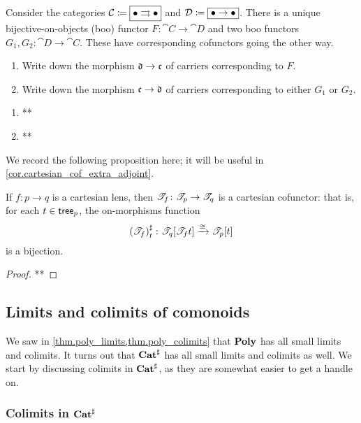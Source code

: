 \documentclass[Book-Poly]{subfiles}
\begin{document}
\begin{exercise}
Consider the categories $\mathcal{C}\coloneqq\fbox{$\bullet\rightrightarrows\bullet$}$ and $\mathcal{D}\coloneqq\fbox{$\bullet\to\bullet$}$. There is a unique bijective-on-objects (boo) functor $F\colon\cat{C}\to\cat{D}$ and two boo functors $G_1,G_2\colon\cat{D}\to\cat{C}$. These have corresponding cofunctors going the other way.
\begin{enumerate}
	\item Write down the morphism $\mathfrak{d}\to\mathfrak{c}$ of carriers corresponding to $F$.
	\item Write down the morphism $\mathfrak{c}\to\mathfrak{d}$ of carriers corresponding to either $G_1$ or $G_2$.
\qedhere
\end{enumerate}
\begin{solution}
\begin{enumerate}
    \item **
    \item **
\end{enumerate}
\end{solution}
\end{exercise}

We record the following proposition here; it will be useful in \cref{cor.cartesian_cof_extra_adjoint}.

\begin{proposition}
If $f\colon p\to q$ is a cartesian lens, then $\mathscr{T}_{f}\colon\mathscr{T}_{p}\to\mathscr{T}_{q}$ is a cartesian cofunctor: that is, for each $t\in\mathsf{tree}_p$, the on-morphisms function
\[
    \left(\mathscr{T}_{f}\right)^\sharp_t\colon\mathscr{T}_{q}[\mathscr{T}_{f}t]\xrightarrow{\cong}\mathscr{T}_{p}[t]
\]
is a bijection.
\end{proposition}
\begin{proof}
**
\end{proof}

\subsection{Limits and colimits of comonoids}

We saw in \cref{thm.poly_limits,thm.poly_colimits} that $\mathbf{Poly}$ has all small limits and colimits.
It turns out that $\mathbf{Cat}^\sharp$ has all small limits and colimits as well.
We start by discussing colimits in $\mathbf{Cat}^\sharp$, as they are somewhat easier to get a handle on.

\subsubsection{Colimits in $\mathbf{Cat}^\sharp$}
\end{document}
